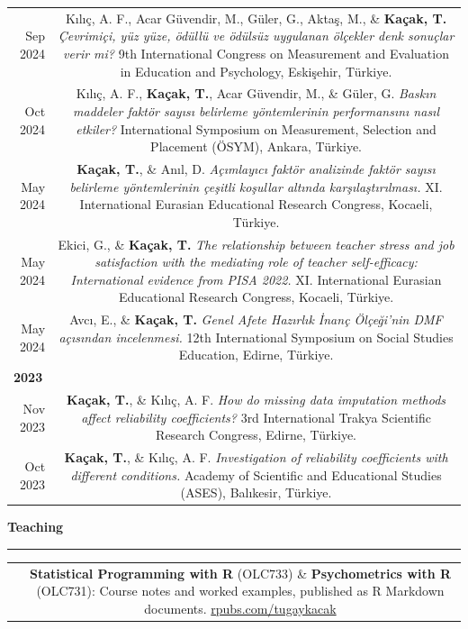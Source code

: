 \documentclass[10pt,a4paper]{article}
\newcommand{\me}[1]{\textbf{\color{headwhite}#1}}
\newcommand{\cvsection}[1]{%
  \vspace{10pt}%
  {\color{headwhite}\large\bfseries #1}\par
  \vspace{2pt}
  {\color{rulegray}\hrule height 0.6pt}
  \vspace{7pt}
}
\newenvironment{cvtable}{%
  \begin{longtable}{D!{\color{rulegray}\vrule width 0.6pt\hspace{4pt}}C}
}{%
  \end{longtable}
}
\newcommand{\cvrow}[2]{#1 & #2 \\[7pt]}
\newcommand{\cvyearhead}[1]{\multicolumn{2}{l}{\rule{0pt}{18pt}\color{headwhite}\bfseries #1}\\[3pt]}
\begin{document}
\begin{cvtable}
\cvrow{Sep 2024}{Kılıç, A. F., Acar G\"uvendir, M., G\"uler, G., Aktaş, M., \& \me{Kaçak, T.} \textit{\c{C}evrimi\c{c}i, y\"uz y\"uze, \"od\"ull\"u ve \"od\"uls\"uz uygulanan \"ol\c{c}ekler denk sonu\c{c}lar verir mi?} 9th International Congress on Measurement and Evaluation in Education and Psychology, Eskişehir, T\"urkiye.}
\cvrow{Oct 2024}{Kılıç, A. F., \me{Kaçak, T.}, Acar G\"uvendir, M., \& G\"uler, G. \textit{Baskın maddeler fakt\"or sayısı belirleme y\"ontemlerinin performansını nasıl etkiler?} International Symposium on Measurement, Selection and Placement (\"OSYM), Ankara, T\"urkiye.}
\cvrow{May 2024}{\me{Kaçak, T.}, \& Anıl, D. \textit{A\c{c}ımlayıcı fakt\"or analizinde fakt\"or sayısı belirleme y\"ontemlerinin \c{c}eşitli koşullar altında karşılaştırılması.} XI. International Eurasian Educational Research Congress, Kocaeli, T\"urkiye.}
\cvrow{May 2024}{Ekici, G., \& \me{Kaçak, T.} \textit{The relationship between teacher stress and job satisfaction with the mediating role of teacher self-efficacy: International evidence from PISA 2022.} XI. International Eurasian Educational Research Congress, Kocaeli, T\"urkiye.}
\cvrow{May 2024}{Avcı, E., \& \me{Kaçak, T.} \textit{Genel Afete Hazırlık İnanç \"Ol\c{c}e\u{g}i'nin DMF a\c{c}ısından incelenmesi.} 12th International Symposium on Social Studies Education, Edirne, T\"urkiye.}
\cvyearhead{2023}
\cvrow{Nov 2023}{\me{Kaçak, T.}, \& Kılıç, A. F. \textit{How do missing data imputation methods affect reliability coefficients?} 3rd International Trakya Scientific Research Congress, Edirne, T\"urkiye.}
\cvrow{Oct 2023}{\me{Kaçak, T.}, \& Kılıç, A. F. \textit{Investigation of reliability coefficients with different conditions.} Academy of Scientific and Educational Studies (ASES), Balıkesir, T\"urkiye.}
\end{cvtable}

\cvsection{Teaching}
\begin{cvtable}
\cvrow{}{\me{Statistical Programming with R} (OLC733) \& \me{Psychometrics with R} (OLC731): Course notes and worked examples, published as R Markdown documents. \href{https://rpubs.com/tugaykacak}{\color{linkblue}rpubs.com/tugaykacak}}
\end{cvtable}
\end{document}
